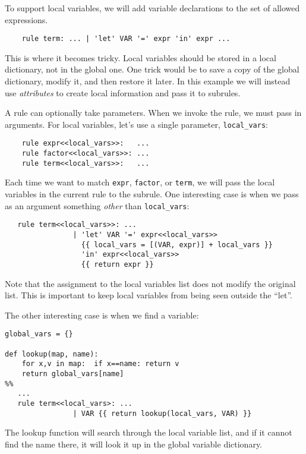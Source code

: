 \documentclass[10pt]{article}
\begin{document}
To support local variables, we will add variable declarations to the
set of allowed expressions.

\begin{verbatim}
    rule term: ... | 'let' VAR '=' expr 'in' expr ...
\end{verbatim}

This is where it becomes tricky.  Local variables should be stored in
a local dictionary, not in the global one.  One trick would be to save 
a copy of the global dictionary, modify it, and then restore it
later.  In this example we will instead use \emph{attributes} to
create local information and pass it to subrules.

A rule can optionally take parameters.  When we invoke the rule, we
must pass in arguments.  For local variables, let's use a single
parameter, \texttt{local\_vars}:

\begin{verbatim}
    rule expr<<local_vars>>:   ...
    rule factor<<local_vars>>: ...
    rule term<<local_vars>>:   ...
\end{verbatim}

Each time we want to match \texttt{expr}, \texttt{factor}, or
\texttt{term}, we will pass the local variables in the current rule to
the subrule.  One interesting case is when we pass as an argument
something \emph{other} than \texttt{local\_vars}:

\begin{verbatim}
   rule term<<local_vars>>: ...
                | 'let' VAR '=' expr<<local_vars>>
                  {{ local_vars = [(VAR, expr)] + local_vars }}
                  'in' expr<<local_vars>>
                  {{ return expr }}
\end{verbatim}

Note that the assignment to the local variables list does not modify
the original list.  This is important to keep local variables from
being seen outside the ``let''.

The other interesting case is when we find a variable:

\begin{verbatim}
global_vars = {}

def lookup(map, name):
    for x,v in map:  if x==name: return v
    return global_vars[name]
%%
   ...
   rule term<<local_vars>: ...
                | VAR {{ return lookup(local_vars, VAR) }}
\end{verbatim}

The lookup function will search through the local variable list, and
if it cannot find the name there, it will look it up in the global
variable dictionary.
\end{document}

